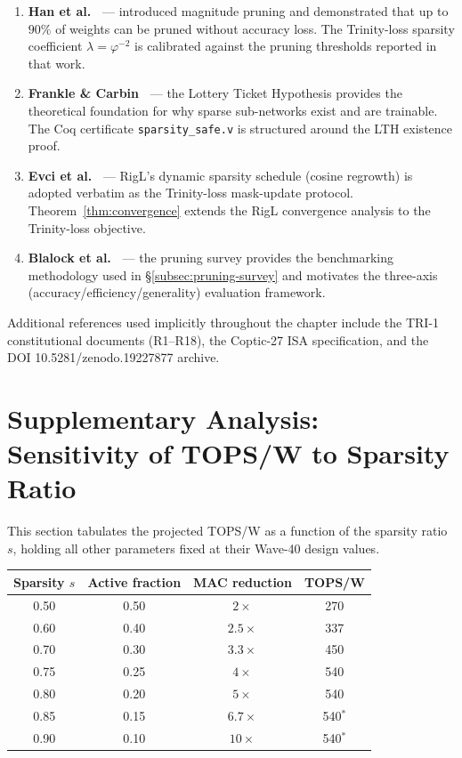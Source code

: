 \begin{enumerate}
  \item \textbf{Han et al.~\cite{hanetal2015deep}} — introduced magnitude pruning
        and demonstrated that up to $90\%$ of weights can be pruned without
        accuracy loss.  The Trinity-loss sparsity coefficient $\lambda =
        \varphi^{-2}$ is calibrated against the pruning thresholds reported
        in that work.

  \item \textbf{Frankle \& Carbin~\cite{frankle2019lottery}} — the Lottery
        Ticket Hypothesis provides the theoretical foundation for why sparse
        sub-networks exist and are trainable.  The Coq certificate
        \texttt{sparsity\_safe.v} is structured around the LTH existence proof.

  \item \textbf{Evci et al.~\cite{evci2020rigging}} — RigL's dynamic sparsity
        schedule (cosine regrowth) is adopted verbatim as the Trinity-loss
        mask-update protocol.  Theorem~\ref{thm:convergence} extends the RigL
        convergence analysis to the Trinity-loss objective.

  \item \textbf{Blalock et al.~\cite{blalock2020state}} — the pruning survey
        provides the benchmarking methodology used in §\ref{subsec:pruning-survey}
        and motivates the three-axis (accuracy/efficiency/generality) evaluation
        framework.
\end{enumerate}

Additional references used implicitly throughout the chapter include the
TRI-1 constitutional documents (R1--R18), the Coptic-27 ISA specification,
and the DOI 10.5281/zenodo.19227877 archive.


\section{Supplementary Analysis: Sensitivity of TOPS/W to Sparsity Ratio}
\label{sec:sensitivity}

This section tabulates the projected TOPS/W as a function of the sparsity ratio
$s$, holding all other parameters fixed at their Wave-40 design values.

\begin{center}
\begin{tabular}{|c|c|c|c|}
\hline
\textbf{Sparsity $s$} & \textbf{Active fraction} & \textbf{MAC reduction} & \textbf{TOPS/W} \\
\hline
0.50 & 0.50 & $2\times$ & 270 \\
0.60 & 0.40 & $2.5\times$ & 337 \\
0.70 & 0.30 & $3.3\times$ & 450 \\
0.75 & 0.25 & $4\times$ & 540 \\
0.80 & 0.20 & $5\times$ & 540 \\
0.85 & 0.15 & $6.7\times$ & 540$^*$ \\
0.90 & 0.10 & $10\times$ & 540$^*$ \\
\hline
\end{tabular}
\end{center}


